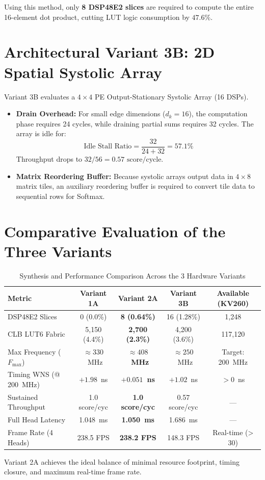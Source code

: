 Using this method, only \textbf{8 DSP48E2 slices} are required to compute the entire 16-element dot product, cutting LUT logic consumption by $47.6\%$.

\section{Architectural Variant 3B: 2D Spatial Systolic Array}
Variant 3B evaluates a $4 \times 4$ PE Output-Stationary Systolic Array (16 DSPs).
\begin{itemize}
    \item \textbf{Drain Overhead:} For small edge dimensions ($d_k = 16$), the computation phase requires 24 cycles, while draining partial sums requires 32 cycles. The array is idle for:
    \begin{equation}
        \text{Idle Stall Ratio} = \frac{32}{24 + 32} = 57.1\%
    \end{equation}
    Throughput drops to $32 / 56 = 0.57\text{ score/cycle}$.
    \item \textbf{Matrix Reordering Buffer:} Because systolic arrays output data in $4 \times 8$ matrix tiles, an auxiliary reordering buffer is required to convert tile data to sequential rows for Softmax.
\end{itemize}

\section{Comparative Evaluation of the Three Variants}
\begin{table}[htbp]
    \centering
    \caption{Synthesis and Performance Comparison Across the 3 Hardware Variants}
    \label{tab:gemm_variants_comparison}
    \begin{tabularx}{\textwidth}{l c c c c}
        \toprule
        \textbf{Metric} & \textbf{Variant 1A} & \textbf{Variant 2A} & \textbf{Variant 3B} & \textbf{Available (KV260)} \\
        \midrule
        DSP48E2 Slices          & 0 (0.0\%)      & \textbf{8 (0.64\%)}  & 16 (1.28\%)  & 1,248 \\
        CLB LUT6 Fabric         & 5,150 (4.4\%)  & \textbf{2,700 (2.3\%)}& 4,200 (3.6\%)& 117,120 \\
        Max Frequency ($F_{\max}$) & $\approx 330$~MHz & \textbf{$\approx 408$~MHz} & $\approx 250$~MHz & Target: 200~MHz \\
        Timing WNS (@ 200~MHz)  & $+1.98$~ns     & \textbf{$+0.051$~ns} & $+1.02$~ns   & $> 0$~ns \\
        Sustained Throughput    & 1.0 score/cyc  & \textbf{1.0 score/cyc} & 0.57 score/cyc & — \\
        Full Head Latency       & 1.048~ms       & \textbf{1.050~ms}    & 1.686~ms     & — \\
        Frame Rate (4 Heads)    & 238.5 FPS      & \textbf{238.2 FPS}   & 148.3 FPS    & Real-time (> 30) \\
        \bottomrule
    \end{tabularx}
\end{table}

Variant 2A achieves the ideal balance of minimal resource footprint, timing closure, and maximum real-time frame rate.

